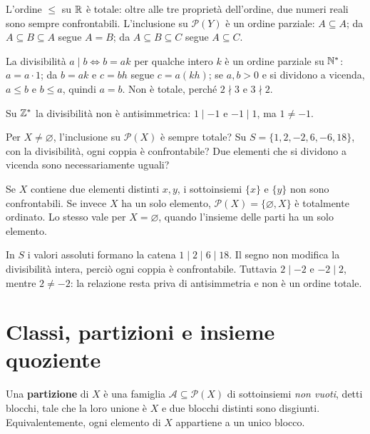\begin{esempio}
L'ordine $\le$ su $\mathbb{R}$ è totale: oltre alle tre proprietà dell'ordine, due numeri reali sono sempre confrontabili. L'inclusione su $\mathcal P(Y)$ è un ordine parziale: $A\subseteq A$; da $A\subseteq B\subseteq A$ segue $A=B$; da $A\subseteq B\subseteq C$ segue $A\subseteq C$.

La divisibilità $a\mid b\iff b=ak$ per qualche intero $k$ è un ordine parziale su $\mathbb{N}^*$: $a=a\cdot1$; da $b=ak$ e $c=bh$ segue $c=a(kh)$; se $a,b>0$ e si dividono a vicenda, $a\le b$ e $b\le a$, quindi $a=b$. Non è totale, perché $2\nmid3$ e $3\nmid2$.

Su $\mathbb{Z}^*$ la divisibilità non è antisimmetrica: $1\mid-1$ e $-1\mid1$, ma $1\ne-1$.
\end{esempio}

\begin{esercizio}
Per $X\ne\varnothing$, l'inclusione su $\mathcal P(X)$ è sempre totale? Su $S=\{1,2,-2,6,-6,18\}$, con la divisibilità, ogni coppia è confrontabile? Due elementi che si dividono a vicenda sono necessariamente uguali?
\end{esercizio}
\begin{svolgimento}
Se $X$ contiene due elementi distinti $x,y$, i sottoinsiemi $\{x\}$ e $\{y\}$ non sono confrontabili. Se invece $X$ ha un solo elemento, $\mathcal P(X)=\{\varnothing,X\}$ è totalmente ordinato. Lo stesso vale per $X=\varnothing$, quando l'insieme delle parti ha un solo elemento.

In $S$ i valori assoluti formano la catena $1\mid2\mid6\mid18$. Il segno non modifica la divisibilità intera, perciò ogni coppia è confrontabile. Tuttavia $2\mid-2$ e $-2\mid2$, mentre $2\ne-2$: la relazione resta priva di antisimmetria e non è un ordine totale.
\end{svolgimento}

\section{Classi, partizioni e insieme quoziente}
\begin{definizione}
Una \textbf{partizione} di $X$ è una famiglia $\mathcal A\subseteq\mathcal P(X)$ di sottoinsiemi \emph{non vuoti}, detti blocchi, tale che la loro unione è $X$ e due blocchi distinti sono disgiunti. Equivalentemente, ogni elemento di $X$ appartiene a un unico blocco.
\end{definizione}

